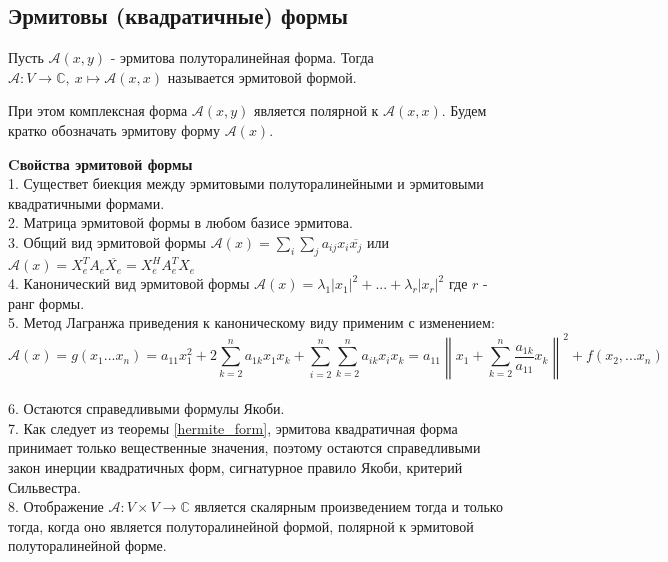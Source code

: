 \subsection{Эрмитовы (квадратичные) формы}
\begin{defin}
Пусть $\mathcal A(x,y)$ - эрмитова полуторалинейная форма. Тогда $\mathcal
A\colon V\to\mathbb C,~x\mapsto\mathcal A(x,x)$ называется эрмитовой формой. 
\end{defin}
При этом комплексная форма $\mathcal A(x,y)$ является полярной к $\mathcal
A(x,x)$. Будем кратко обозначать эрмитову форму $\mathcal A(x)$.

\textbf{Cвойства эрмитовой формы}\\
1. Существет биекция между эрмитовыми полуторалинейными и эрмитовыми 
квадратичными формами.\\
2. Матрица эрмитовой формы в любом базисе эрмитова. \\
3. Общий вид эрмитовой формы $\mathcal A(x)=\sum_i\sum_ja_{ij}x_i
\overline{x_j}$ или $\mathcal A(x)=X_e^TA_e\overline{X_e}=X_e^HA_e^TX_e$\\
4. Канонический вид эрмитовой формы
$\mathcal A(x)=\lambda_1|x_1|^2+...+\lambda_r|x_r|^2$ где $r$ - ранг формы.\\
5. Метод Лагранжа приведения к каноническому виду применим с изменением:
$$\mathcal A(x)=g(x_1...x_n)=a_{11}x_1^2+2\sum\limits_{k=2}^na_{1k}x_1x_k+
\sum\limits_{i=2}^n\sum\limits^n_{k=2}a_{ik}x_ix_k=a_{11}\left\|x_1+\sum
\limits_{k=2}^n\frac{a_{1k}}{a_{11}}x_k\right\|^2+f(x_2,...x_n)$$\\
6. Остаются справедливыми формулы Якоби.\\
7. Как следует из теоремы \ref{hermite_form}, эрмитова квадратичная форма
принимает только вещественные значения, поэтому остаются справедливыми закон
инерции квадратичных форм, сигнатурное правило Якоби, критерий Сильвестра.\\
8. Отображение $\mathcal A\colon V\times V\to\mathbb C$ является скалярным
произведением тогда и только тогда, когда оно является полуторалинейной
формой, полярной к эрмитовой полуторалинейной форме. 

